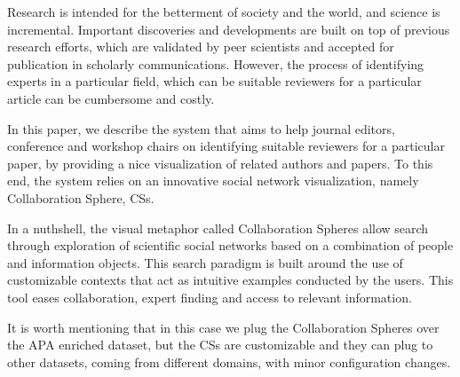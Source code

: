 Research is intended for the betterment of society and the world, and science is incremental. Important discoveries and developments are built on top of previous research efforts, which are validated by peer scientists and accepted for publication in scholarly communications. However, the process of identifying experts in a particular field, which can be suitable reviewers for a particular article can be cumbersome and costly.

In this paper, we describe the system that aims to help journal editors, conference and workshop chairs on identifying suitable reviewers for a particular paper, by providing a nice visualization of related authors and papers. To this end, the system relies on an innovative social network visualization, namely Collaboration Sphere, CSs. 

In a nuthshell, the visual metaphor called Collaboration Spheres allow search through exploration of scientific social networks based on a combination of people and information objects. This search paradigm is built around the use of customizable contexts that act as intuitive examples conducted by the users. This tool eases collaboration, expert finding and access to relevant information.

It is worth mentioning that in this case we plug the Collaboration Spheres over the APA enriched dataset, but the CSs are customizable and they can plug to other datasets, coming from different domains, with minor configuration changes.


